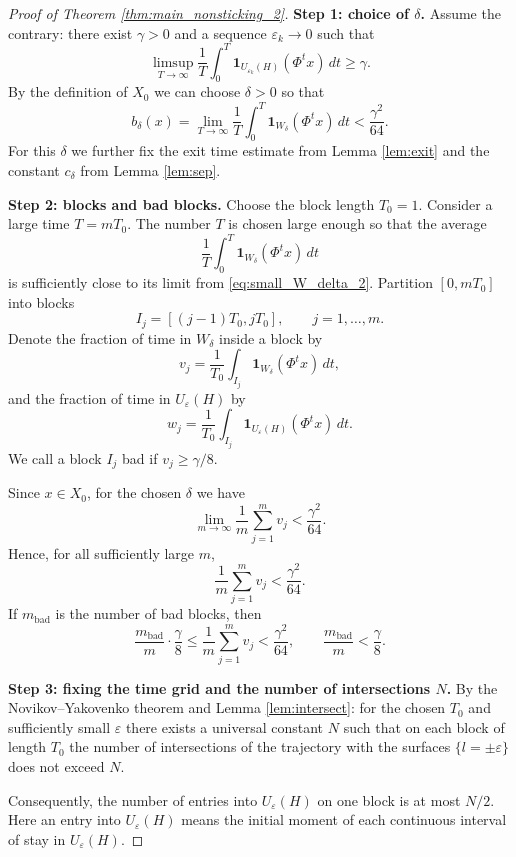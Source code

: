 \documentclass[11pt]{article}
\newcommand{\eps}{\varepsilon}
\newcommand{\dd}{\,d}
\theoremstyle{thmstyleone}
\theoremstyle{thmstyletwo}
\theoremstyle{thmstylethree}
\begin{document}
\begin{appendices}
\begin{proof}[Proof of Theorem \ref{thm:main_nonsticking_2}]
\textbf{Step 1: choice of $\delta$.}
Assume the contrary: there exist $\gamma>0$ and a sequence $\eps_k\to0$ such that
\begin{equation}\label{eq:contradiction_assumption_2}
    \limsup_{T\to\infty}\frac1T\int_0^T\mathbf 1_{U_{\eps_k}(H)}(\Phi^t x)\dd t\ge\gamma.
\end{equation}
By the definition of $X_0$ we can choose $\delta>0$ so that
\begin{equation}\label{eq:small_W_delta_2}
    b_\delta(x)=\lim_{T\to\infty}\frac1T\int_0^T\mathbf 1_{W_\delta}(\Phi^t x)\dd t<\frac{\gamma^2}{64}.
\end{equation}
For this $\delta$ we further fix the exit time estimate from Lemma \ref{lem:exit} and the constant $c_\delta$ from Lemma \ref{lem:sep}.

\textbf{Step 2: blocks and bad blocks.}
Choose the block length $T_0=1$. Consider a large time $T=mT_0$. The number $T$ is chosen large enough so that the average
\[
    \frac1T\int_0^T\mathbf 1_{W_\delta}(\Phi^t x)\dd t
\]
is sufficiently close to its limit from \eqref{eq:small_W_delta_2}. Partition $[0,mT_0]$ into blocks
\[
    I_j=[(j-1)T_0,jT_0],
    \qquad j=1,\dots,m.
\]
Denote the fraction of time in $W_\delta$ inside a block by
\[
    v_j=\frac1{T_0}\int_{I_j}\mathbf 1_{W_\delta}(\Phi^t x)\dd t,
\]
and the fraction of time in $U_\eps(H)$ by
\[
    w_j=\frac1{T_0}\int_{I_j}\mathbf 1_{U_\eps(H)}(\Phi^t x)\dd t.
\]
We call a block $I_j$ bad if $v_j\ge\gamma/8$.

Since $x\in X_0$, for the chosen $\delta$ we have
\[
    \lim_{m\to\infty}\frac1m\sum_{j=1}^m v_j<\frac{\gamma^2}{64}.
\]
Hence, for all sufficiently large $m$,
\[
    \frac1m\sum_{j=1}^m v_j<\frac{\gamma^2}{64}.
\]
If $m_{\mathrm{bad}}$ is the number of bad blocks, then
\begin{equation}\label{eq:bad_blocks_2}
    \frac{m_{\mathrm{bad}}}{m}\cdot\frac\gamma8
    \le\frac1m\sum_{j=1}^m v_j
    <\frac{\gamma^2}{64},
    \qquad
    \frac{m_{\mathrm{bad}}}{m}<\frac\gamma8.
\end{equation}

\textbf{Step 3: fixing the time grid and the number of intersections $N$.}
By the Novikov–Yakovenko theorem and Lemma \ref{lem:intersect}: for the chosen $T_0$ and sufficiently small $\eps$ there exists a universal constant $N$ such that on each block of length $T_0$ the number of intersections of the trajectory with the surfaces $\{l=\pm\eps\}$ does not exceed $N$.

Consequently, the number of entries into $U_\eps(H)$ on one block is at most $N/2$. Here an entry into $U_\eps(H)$ means the initial moment of each continuous interval of stay in $U_\eps(H)$.


\end{proof}
\end{appendices}
\end{document}
